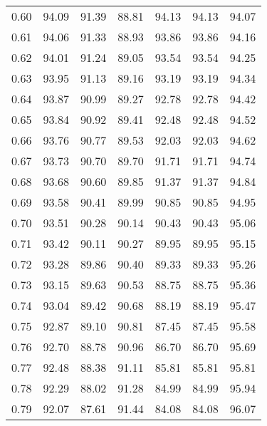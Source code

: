 \begin{tabular}{|c|c|c|c|c|c|c|}
      0.60 &     94.09 &     91.39 &      88.81 &   94.13 &      94.13 &         94.07 \\
      0.61 &     94.06 &     91.33 &      88.93 &   93.86 &      93.86 &         94.16 \\
      0.62 &     94.01 &     91.24 &      89.05 &   93.54 &      93.54 &         94.25 \\
      0.63 &     93.95 &     91.13 &      89.16 &   93.19 &      93.19 &         94.34 \\
      0.64 &     93.87 &     90.99 &      89.27 &   92.78 &      92.78 &         94.42 \\
      0.65 &     93.84 &     90.92 &      89.41 &   92.48 &      92.48 &         94.52 \\
      0.66 &     93.76 &     90.77 &      89.53 &   92.03 &      92.03 &         94.62 \\
      0.67 &     93.73 &     90.70 &      89.70 &   91.71 &      91.71 &         94.74 \\
      0.68 &     93.68 &     90.60 &      89.85 &   91.37 &      91.37 &         94.84 \\
      0.69 &     93.58 &     90.41 &      89.99 &   90.85 &      90.85 &         94.95 \\
      0.70 &     93.51 &     90.28 &      90.14 &   90.43 &      90.43 &         95.06 \\
      0.71 &     93.42 &     90.11 &      90.27 &   89.95 &      89.95 &         95.15 \\
      0.72 &     93.28 &     89.86 &      90.40 &   89.33 &      89.33 &         95.26 \\
      0.73 &     93.15 &     89.63 &      90.53 &   88.75 &      88.75 &         95.36 \\
      0.74 &     93.04 &     89.42 &      90.68 &   88.19 &      88.19 &         95.47 \\
      0.75 &     92.87 &     89.10 &      90.81 &   87.45 &      87.45 &         95.58 \\
      0.76 &     92.70 &     88.78 &      90.96 &   86.70 &      86.70 &         95.69 \\
      0.77 &     92.48 &     88.38 &      91.11 &   85.81 &      85.81 &         95.81 \\
      0.78 &     92.29 &     88.02 &      91.28 &   84.99 &      84.99 &         95.94 \\
      0.79 &     92.07 &     87.61 &      91.44 &   84.08 &      84.08 &         96.07 \\

\end{tabular}
